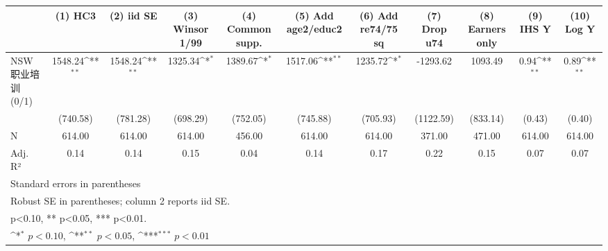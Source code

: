 {
\def\sym#1{\ifmmode^{#1}\else\(^{#1}\)\fi}
\begin{tabular}{l*{10}{c}}
\toprule
                    &\multicolumn{1}{c}{(1) HC3}&\multicolumn{1}{c}{(2) iid SE}&\multicolumn{1}{c}{(3) Winsor 1/99}&\multicolumn{1}{c}{(4) Common supp.}&\multicolumn{1}{c}{(5) Add age2/educ2}&\multicolumn{1}{c}{(6) Add re74/75 sq}&\multicolumn{1}{c}{(7) Drop u74}&\multicolumn{1}{c}{(8) Earners only}&\multicolumn{1}{c}{(9) IHS Y}&\multicolumn{1}{c}{(10) Log Y}\\
\midrule
NSW 职业培训 (0/1)  &     1548.24\sym{**} &     1548.24\sym{**} &     1325.34\sym{*}  &     1389.67\sym{*}  &     1517.06\sym{**} &     1235.72\sym{*}  &    -1293.62         &     1093.49         &        0.94\sym{**} &        0.89\sym{**} \\
                    &    (740.58)         &    (781.28)         &    (698.29)         &    (752.05)         &    (745.88)         &    (705.93)         &   (1122.59)         &    (833.14)         &      (0.43)         &      (0.40)         \\
\midrule
N                   &      614.00         &      614.00         &      614.00         &      456.00         &      614.00         &      614.00         &      371.00         &      471.00         &      614.00         &      614.00         \\
Adj. R²             &        0.14         &        0.14         &        0.15         &        0.04         &        0.14         &        0.17         &        0.22         &        0.15         &        0.07         &        0.07         \\
\bottomrule
\multicolumn{11}{l}{\footnotesize Standard errors in parentheses}\\
\multicolumn{11}{l}{\footnotesize Robust SE in parentheses; column 2 reports iid SE.}\\
\multicolumn{11}{l}{\footnotesize * p<0.10, ** p<0.05, *** p<0.01.}\\
\multicolumn{11}{l}{\footnotesize \sym{*} \(p<0.10\), \sym{**} \(p<0.05\), \sym{***} \(p<0.01\)}\\
\end{tabular}
}
